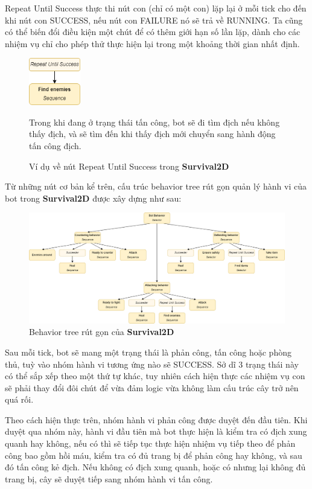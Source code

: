 \documentclass[12pt,a4paper]{article}
\begin{document}
\begin{itemize}
      Repeat Until Success thực thi nút con (chỉ có một con) lặp lại ở mỗi tick cho đến khi nút con SUCCESS, nếu nút con FAILURE nó sẽ trả về RUNNING. Ta cũng có thể biến đổi điều kiện một chút để có thêm giới hạn số lần lặp, dành cho các nhiệm vụ chỉ cho phép thử thực hiện lại trong một khoảng thời gian nhất định.
     \begin{figure}[H]
          \centering
          \includegraphics[width=0.2\textwidth]{Img/AI/repeat-until-success.png}
          \caption{Ví dụ về nút Repeat Until Success trong \textbf{Survival2D}}
          Trong khi đang ở trạng thái tấn công, bot sẽ đi tìm địch nếu không thấy địch, và sẽ tìm đến khi thấy địch mới chuyển sang hành động tấn công địch.
      \end{figure}
  \end{itemize}
  Từ những nút cơ bản kể trên, cấu trúc behavior tree rút gọn quản lý hành vi của bot trong \textbf{Survival2D} được xây dựng như sau:
  \begin{figure}[H]
      \centering
      \includegraphics[width=1\textwidth]{Img/AI/bot-behavior.png}
      \caption{Behavior tree rút gọn của \textbf{Survival2D}}
  \end{figure}
  Sau mỗi tick, bot sẽ mang một trạng thái là phản công, tấn công hoặc phòng thủ, tuỳ vào nhóm hành vi tương ứng nào sẽ SUCCESS. Sở dĩ 3 trạng thái này có thể sắp xếp theo một thứ tự khác, tuy nhiên cách hiện thực các nhiệm vụ con sẽ phải thay đổi đôi chút để vừa đảm logic vừa không làm cấu trúc cây trở nên quá rối.

  Theo cách hiện thực trên, nhóm hành vi phản công được duyệt đến đầu tiên. Khi duyệt qua nhóm này, hành vi đầu tiên mà bot thực hiện là kiểm tra có địch xung quanh hay không, nếu có thì sẽ tiếp tục thực hiện nhiệm vụ tiếp theo để phản công bao gồm hồi máu, kiểm tra có đủ trang bị để phản công hay không, và sau đó tấn công kẻ địch. Nếu không có địch xung quanh, hoặc có nhưng lại không đủ trang bị, cây sẽ duyệt tiếp sang nhóm hành vi tấn công.
\end{document}

